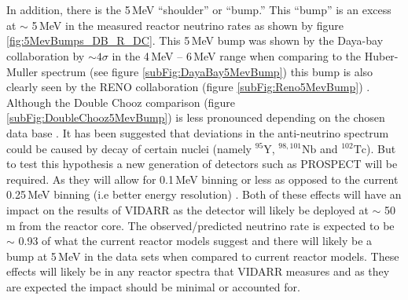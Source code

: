 \\\\In addition, there is the 5\,MeV ``shoulder'' or ``bump.'' This ``bump'' is an excess at $\sim$ 5\,MeV in the measured reactor neutrino rates as shown by figure \ref{fig:5MevBumps_DB_R_DC}. This 5\,MeV bump was shown by the Daya-bay collaboration by $\sim 4 \sigma$ in the 4\,MeV -- 6\,MeV range when comparing to the Huber-Muller spectrum \cite{dayaBay2016_anFlux} (see figure \ref{subFig:DayaBay5MevBump}) this bump is also clearly seen by the  RENO collaboration (figure \ref{subFig:Reno5MevBump}) \cite{Hayes_implicationsShoulder_2015} \cite{dayaBay2016_anFlux} \cite{reno_recentResults_2014}. Although the Double Chooz comparison (figure \ref{subFig:DoubleChooz5MevBump}) is less pronounced depending on the chosen data base \cite{Hayes_implicationsShoulder_2015}. It has been suggested that deviations in the anti-neutrino spectrum could be caused by decay of certain nuclei (namely $^{95}\textrm{Y}$, $^{98,101}\textrm{Nb}$ and $^{102}\textrm{Tc}$). But to test this hypothesis a new generation of detectors such as PROSPECT \cite{Ashenfelter_PROSPECT_2016} will be required. As they will allow for 0.1\,MeV binning or less as opposed to the current 0.25\,MeV binning (i.e better energy resolution) \cite{AaSonzogni_fineAnSpectra_2017}. Both of these effects will have an impact on the results of VIDARR as the detector will likely be deployed at $\sim$ 50\,m from the reactor core. The observed/predicted neutrino rate is expected to be $\sim$ 0.93 of what the current reactor models suggest and there will likely be a bump at 5\,MeV in the data sets when compared to current reactor models. These effects will likely be in any reactor spectra that VIDARR measures and as they are expected the impact should be minimal or accounted for.

